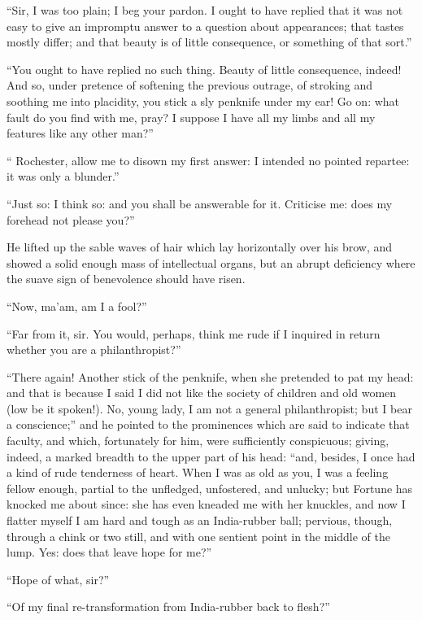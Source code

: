 \enquote{Sir, I was too plain; I beg your pardon. I ought to have
	replied that it was not easy to give an impromptu answer to a question
	about appearances; that tastes mostly differ; and that beauty is of
	little consequence, or something of that sort.}

\enquote{You ought to have replied no such thing. Beauty of little
	consequence, indeed! And so, under pretence of softening the previous
	outrage, of stroking and soothing me into placidity, you stick a sly
	penknife under my ear! Go on: what fault do you find with me, pray? I
	suppose I have all my limbs and all my features like any other man?}

\enquote{\Mr{} Rochester, allow me to disown my first answer: I intended
	no pointed repartee: it was only a blunder.}

\enquote{Just so: I think so: and you shall be answerable for it.
	Criticise me: does my forehead not please you?}

He lifted up the sable waves of hair which lay horizontally over his
brow, and showed a solid enough mass of intellectual organs, but an
abrupt deficiency where the suave sign of benevolence should have risen.

\enquote{Now, ma'am, am I a fool?}

\enquote{Far from it, sir. You would, perhaps, think me rude if I
	inquired in return whether you are a philanthropist?}

\enquote{There again! Another stick of the penknife, when she pretended
	to pat my head: and that is because I said I did not like the society of
	children and old women (low be it spoken!). No, young lady, I am not a
	general philanthropist; but I bear a conscience;} and he pointed to the
prominences which are said to indicate that faculty, and which,
fortunately for him, were sufficiently conspicuous; giving, indeed, a
marked breadth to the upper part of his head: \enquote{and, besides, I
	once had a kind of rude tenderness of heart. When I was as old as you,
	I was a feeling fellow enough, partial to the unfledged, unfostered, and
	unlucky; but Fortune has knocked me about since: she has even kneaded me
	with her knuckles, and now I flatter myself I am hard and tough as an
	India-rubber ball; pervious, though, through a chink or two still, and
	with one sentient point in the middle of the lump. Yes: does that leave
	hope for me?}

\enquote{Hope of what, sir?}

\enquote{Of my final re-transformation from India-rubber back to flesh?}

